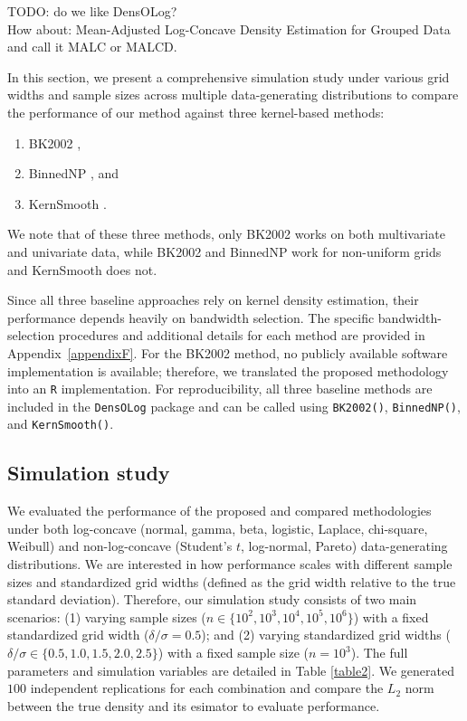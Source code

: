 \documentclass[12pt]{article} %
\newcommand{\comH}[1]{{\noindent \color{blue}#1}}
\newcommand{\comF}[1]{{\noindent \color{purple}#1}}
\begin{document}
\comH{TODO: do we like DensOLog?} \\
\comF{How about: Mean-Adjusted Log-Concave Density Estimation for Grouped Data and call it MALC or MALCD.}

In this section, we present a comprehensive simulation study under various grid widths and sample sizes across multiple data-generating distributions to compare the performance of our method against three kernel-based methods: 
\begin{enumerate}
\item BK2002 \citep{BlowerKelsall2002}, 
\item BinnedNP \citep{binnednp2019}, and 
\item KernSmooth \citep{KernSmoothPackage}.
\end{enumerate}
We note that of these three methods, only BK2002 works on both multivariate and univariate data, while BK2002 and BinnedNP work for non-uniform grids and KernSmooth does not.  


Since all three baseline approaches rely on kernel density estimation, their performance depends heavily on bandwidth selection. The specific bandwidth-selection procedures and additional details for each method are provided in Appendix~\ref{appendixF}. For the BK2002 method, no publicly available software implementation is available; therefore, we translated the proposed methodology into an \texttt{R} implementation. For reproducibility, all three baseline methods are included in the \texttt{DensOLog} package and can be called using \texttt{BK2002()}, \texttt{BinnedNP()}, and \texttt{KernSmooth()}.

\subsection{Simulation study}
\label{subsec:simstudy}

We evaluated the performance of the proposed and compared methodologies under both log-concave (normal, gamma, beta, logistic, Laplace, chi-square, Weibull) and non-log-concave (Student’s $t$, log-normal, Pareto) data-generating distributions. We are interested in how performance scales with different sample sizes and standardized grid widths (defined as the grid width relative to the true standard deviation). Therefore, our simulation study consists of two main scenarios: (1) varying sample sizes ($n \in \{10^2, 10^3, 10^4, 10^5, 10^6\}$) with a fixed standardized grid width ($\delta/\sigma = 0.5$); and (2) varying standardized grid widths ($\delta/\sigma \in \{0.5, 1.0, 1.5, 2.0, 2.5\}$) with a fixed sample size ($n = 10^3$). The full parameters and simulation variables are detailed in Table \ref{table2}. We generated $100$ independent replications for each combination and compare the $L_2$ norm between the true density and its esimator to evaluate performance. 
\end{document}
